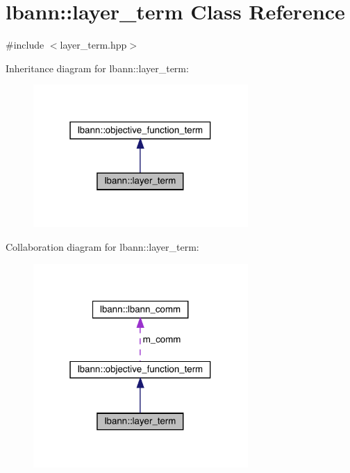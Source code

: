 \hypertarget{classlbann_1_1layer__term}{}\section{lbann\+:\+:layer\+\_\+term Class Reference}
\label{classlbann_1_1layer__term}


{\ttfamily \#include $<$layer\+\_\+term.\+hpp$>$}



Inheritance diagram for lbann\+:\+:layer\+\_\+term\+:\nopagebreak
\begin{figure}[H]
\begin{center}
\leavevmode
\includegraphics[width=232pt]{classlbann_1_1layer__term__inherit__graph}
\end{center}
\end{figure}


Collaboration diagram for lbann\+:\+:layer\+\_\+term\+:\nopagebreak
\begin{figure}[H]
\begin{center}
\leavevmode
\includegraphics[width=232pt]{classlbann_1_1layer__term__coll__graph}
\end{center}
\end{figure}
